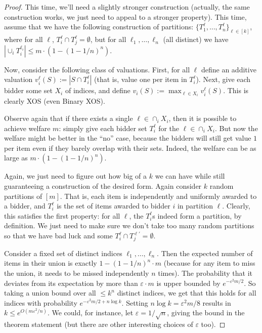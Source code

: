   \begin{proof} This time, we'll need a slightly stronger construction (actually,
    the same construction works, we just need to appeal to a stronger property).
    This time, assume that we have the following construction of partitions:
    $\{T_1^\ell,\ldots, T_n^\ell\}_{\ell \in [k]}$, where for all $\ell$,
    $T_i^\ell \cap T_j^\ell = \emptyset$, but for all $\ell_1,\ldots, \ell_n$ (all
    distinct) we have $|\cup_i T_i^{\ell_i}| \leq m\cdot (1-(1-1/n)^n)$. 

  Now, consider the following class of valuations. First, for all $\ell$ define an
  additive valuation $v_i^\ell(S) := |S \cap T_i^\ell|$ (that is, value one per
  item in $T_i^\ell$). Next, give each bidder some set $X_i$ of indices, and
  define $v_i(S) := \max_{\ell \in X_i} v_i^\ell(S)$. This is clearly XOS (even
  Binary XOS). 

  Observe again that if there exists a single $\ell \in \cap_i X_i$, then it is
  possible to achieve welfare $m$: simply give each bidder set $T_i^\ell$ for the
  $\ell \in \cap_i X_i$. But now the welfare might be better in the ``no'' case,
  because the bidders will still get value $1$ per item even if they barely
  overlap with their sets. Indeed, the welfare can be as large as $m \cdot
  (1-(1-1/n)^n)$.

  Again, we just need to figure out how big of a $k$ we can have while still
  guaranteeing a construction of the desired form. Again consider $k$ random
  partitions of $[m]$. That is, each item is independently and uniformly awarded
  to a bidder, and $T_i^\ell$ is the set of items awarded to bidder $i$ in
  partition $\ell$. Clearly, this satisfies the first property: for all $\ell$,
  the $T_i^\ell$s indeed form a partition, by definition. We just need to make
  sure we don't take too many random partitions so that we have bad luck and some
  $T_i^\ell \cap T_j^{\ell'}= \emptyset$. 

  Consider a fixed set of distinct indices $\ell_1,\ldots, \ell_n$. Then the
  expected number of items in their union is exactly $1-(1-1/n)^n \cdot m$
  (because for any item to miss the union, it needs to be missed independently $n$
  times). The probability that it deviates from its expectation by more than
  $\varepsilon \cdot m$ is upper bounded by $e^{-\varepsilon^2 m/2}$. So taking a
  union bound over all $\leq k^n$ distinct indices, we get that this holds for all
  indices with probability $e^{-\varepsilon^2 m/2 + n\log k}$. Setting $n \log k =
  \varepsilon^2 m/8$ results in $k \leq e^{O(m\varepsilon^2/n)}$. We could, for
  instance, let $\varepsilon = 1/\sqrt{n}$, giving the bound in the theorem
  statement (but there are other interesting choices of $\varepsilon$ too).
  \end{proof}

